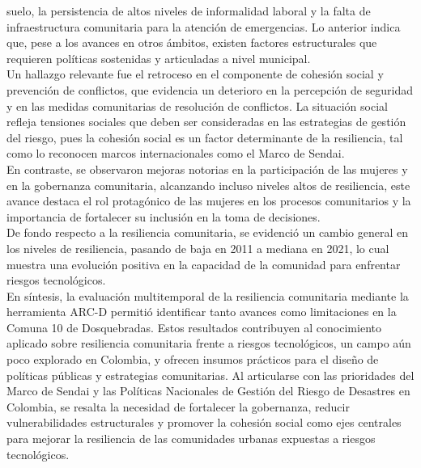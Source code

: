 \documentclass[
  letterpaper,
]{book}
\begin{document}
suelo, la persistencia de altos niveles de informalidad laboral y la
falta de infraestructura comunitaria para la atención de emergencias. Lo
anterior indica que, pese a los avances en otros ámbitos, existen
factores estructurales que requieren políticas sostenidas y articuladas
a nivel municipal.\\
Un hallazgo relevante fue el retroceso en el componente de cohesión
social y prevención de conflictos, que evidencia un deterioro en la
percepción de seguridad y en las medidas comunitarias de resolución de
conflictos. La situación social refleja tensiones sociales que deben ser
consideradas en las estrategias de gestión del riesgo, pues la cohesión
social es un factor determinante de la resiliencia, tal como lo
reconocen marcos internacionales como el Marco de Sendai.\\
En contraste, se observaron mejoras notorias en la participación de las
mujeres y en la gobernanza comunitaria, alcanzando incluso niveles altos
de resiliencia, este avance destaca el rol protagónico de las mujeres en
los procesos comunitarios y la importancia de fortalecer su inclusión en
la toma de decisiones.\\
De fondo respecto a la resiliencia comunitaria, se evidenció un cambio
general en los niveles de resiliencia, pasando de baja en 2011 a mediana
en 2021, lo cual muestra una evolución positiva en la capacidad de la
comunidad para enfrentar riesgos tecnológicos.\\
En síntesis, la evaluación multitemporal de la resiliencia comunitaria
mediante la herramienta ARC-D permitió identificar tanto avances como
limitaciones en la Comuna 10 de Dosquebradas. Estos resultados
contribuyen al conocimiento aplicado sobre resiliencia comunitaria
frente a riesgos tecnológicos, un campo aún poco explorado en Colombia,
y ofrecen insumos prácticos para el diseño de políticas públicas y
estrategias comunitarias. Al articularse con las prioridades del Marco
de Sendai y las Políticas Nacionales de Gestión del Riesgo de Desastres
en Colombia, se resalta la necesidad de fortalecer la gobernanza,
reducir vulnerabilidades estructurales y promover la cohesión social
como ejes centrales para mejorar la resiliencia de las comunidades
urbanas expuestas a riesgos tecnológicos.
\end{document}
